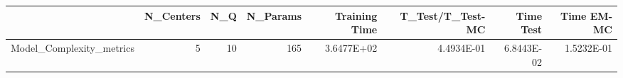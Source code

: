 \begin{tabular}{lrrrrrrr}
\toprule
{} &  N\_Centers &  N\_Q &  N\_Params &  Training Time &  T\_Test/T\_Test-MC &  Time Test &  Time EM-MC \\
\midrule
Model\_Complexity\_metrics &          5 &   10 &       165 &     3.6477E+02 &        4.4934E-01 & 6.8443E-02 &  1.5232E-01 \\
\bottomrule
\end{tabular}
